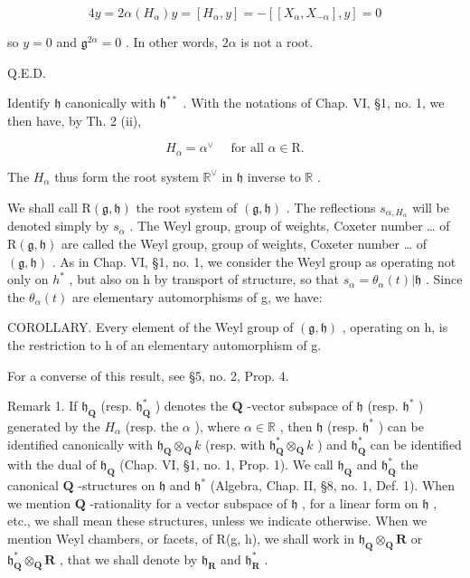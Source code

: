 \[
4 y = 2 \alpha (H _ {\alpha}) y = [ H _ {\alpha}, y ] = - [ [ X _ {\alpha}, X _ {- \alpha} ], y ] = 0
\]

so \(y = 0\) and \(\mathfrak{g}^{2\alpha} = 0\) . In other words, \(2\alpha\) is not a root.

Q.E.D.

Identify \(\mathfrak{h}\) canonically with \(\mathfrak{h}^{**}\) . With the notations of Chap. VI, §1, no. 1, we then have, by Th. 2 (ii),

\[
H _ {\alpha} = \alpha^ {\vee} \quad \text { for   all } \alpha \in \mathrm{R}.\tag{2}
\]

The \(H_{\alpha}\) thus form the root system \(\mathbb{R}^{\vee}\) in \(\mathfrak{h}\) inverse to \(\mathbb{R}\) .

We shall call \(\mathrm{R}(\mathfrak{g},\mathfrak{h})\) the root system of \((\mathfrak{g},\mathfrak{h})\) . The reflections \(s_{\alpha,H_{\alpha}}\) will be denoted simply by \(s_{\alpha}\) . The Weyl group, group of weights, Coxeter number \ldots{} of \(\mathrm{R}(\mathfrak{g},\mathfrak{h})\) are called the Weyl group, group of weights, Coxeter number \ldots{} of \((\mathfrak{g},\mathfrak{h})\) . As in Chap. VI, §1, no. 1, we consider the Weyl group as operating not only on \(h^{*}\) , but also on h by transport of structure, so that \(s_{\alpha} = \theta_{\alpha}(t)|\mathfrak{h}\) . Since the \(\theta_{\alpha}(t)\) are elementary automorphisms of g, we have:

COROLLARY. Every element of the Weyl group of \((\mathfrak{g},\mathfrak{h})\) , operating on h, is the restriction to h of an elementary automorphism of g.

For a converse of this result, see §5, no. 2, Prop. 4.

Remark 1. If \(\mathfrak{h}_{\mathbf{Q}}\) (resp. \(\mathfrak{h}_{\mathbf{Q}}^{*}\) ) denotes the \(\mathbf{Q}\) -vector subspace of \(\mathfrak{h}\) (resp. \(\mathfrak{h}^{*}\) ) generated by the \(H_{\alpha}\) (resp. the \(\alpha\) ), where \(\alpha \in \mathbb{R}\) , then \(\mathfrak{h}\) (resp. \(\mathfrak{h}^{*}\) ) can be identified canonically with \(\mathfrak{h}_{\mathbf{Q}} \otimes_{\mathbf{Q}} k\) (resp. with \(\mathfrak{h}_{\mathbf{Q}}^{*} \otimes_{\mathbf{Q}} k\) ) and \(\mathfrak{h}_{\mathbf{Q}}^{*}\) can be identified with the dual of \(\mathfrak{h}_{\mathbf{Q}}\) (Chap. VI, §1, no. 1, Prop. 1). We call \(\mathfrak{h}_{\mathbf{Q}}\) and \(\mathfrak{h}_{\mathbf{Q}}^{*}\) the canonical \(\mathbf{Q}\) -structures on \(\mathfrak{h}\) and \(\mathfrak{h}^{*}\) (Algebra, Chap. II, §8, no. 1, Def. 1). When we mention \(\mathbf{Q}\) -rationality for a vector subspace of \(\mathfrak{h}\) , for a linear form on \(\mathfrak{h}\) , etc., we shall mean these structures, unless we indicate otherwise. When we mention Weyl chambers, or facets, of R(g, h), we shall work in \(\mathfrak{h}_{\mathbf{Q}} \otimes_{\mathbf{Q}} \mathbf{R}\) or \(\mathfrak{h}_{\mathbf{Q}}^{*} \otimes_{\mathbf{Q}} \mathbf{R}\) , that we shall denote by \(\mathfrak{h}_{\mathbf{R}}\) and \(\mathfrak{h}_{\mathbf{R}}^{*}\) .

